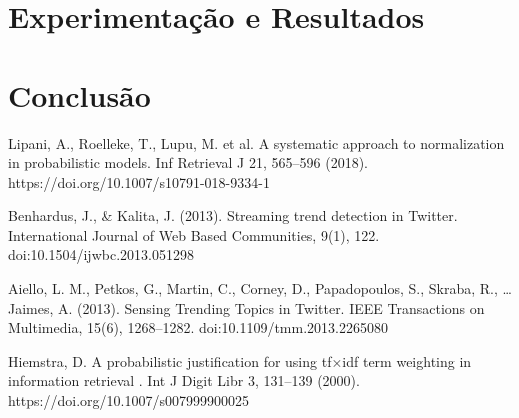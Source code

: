 \documentclass[12pt]{article}
\begin{document}
\section{Experimentação e Resultados}


\section{Conclusão}

\begin{thebibliography}{00}
Lipani, A., Roelleke, T., Lupu, M. et al. A systematic approach to normalization in probabilistic models. Inf Retrieval J 21, 565–596 (2018). https://doi.org/10.1007/s10791-018-9334-1

Benhardus, J., \& Kalita, J. (2013). Streaming trend detection in Twitter. International Journal of Web Based Communities, 9(1), 122. doi:10.1504/ijwbc.2013.051298

Aiello, L. M., Petkos, G., Martin, C., Corney, D., Papadopoulos, S., Skraba, R., … Jaimes, A. (2013). Sensing Trending Topics in Twitter. IEEE Transactions on Multimedia, 15(6), 1268–1282. doi:10.1109/tmm.2013.2265080 

Hiemstra, D. A probabilistic justification for using tf×idf term weighting in information retrieval . Int J Digit Libr 3, 131–139 (2000). https://doi.org/10.1007/s007999900025
\end{thebibliography} 
\end{document}
